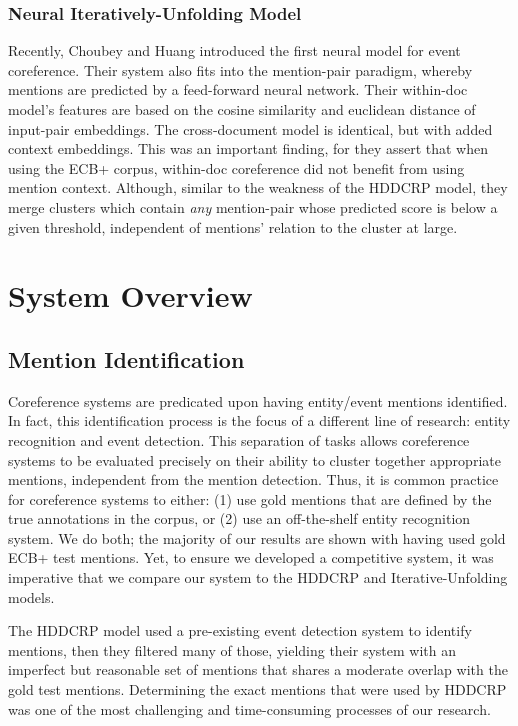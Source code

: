 \documentclass[11pt,a4paper]{article}
\begin{document}
\subsubsection{Neural Iteratively-Unfolding Model}
\label{sec:Choubey}
Recently, Choubey and Huang  introduced the first neural model for event coreference.  Their system also fits into the mention-pair paradigm, whereby mentions are predicted by a feed-forward neural network. Their within-doc model's features are based on the cosine similarity and euclidean distance of input-pair embeddings.  The cross-document model is identical, but with added context embeddings.  This was an important finding, for they assert that when using the ECB+ corpus, within-doc coreference did not benefit from using mention context.  Although, similar to the weakness of the HDDCRP model, they merge clusters which contain \textit{any} mention-pair whose predicted score is below a given threshold, independent of mentions' relation to the cluster at large.

\section{System Overview}
\subsection{Mention Identification}
\label{sec:mentionid}
Coreference systems are predicated upon having entity/event mentions identified.  In fact, this identification process is the focus of a different line of research: entity recognition and event detection.  This separation of tasks allows coreference systems to be evaluated precisely on their ability to cluster together appropriate mentions, independent from the mention detection.  Thus, it is common practice for coreference systems to either: (1) use gold mentions that are defined by the true annotations in the corpus, or (2) use an off-the-shelf entity recognition system.  We do both; the majority of our results are shown with having used gold ECB+ test mentions.  Yet, to ensure we developed a competitive system, it was imperative that we compare our system to the HDDCRP and Iterative-Unfolding models.

The HDDCRP model used a pre-existing event detection system to identify mentions, then they filtered many of those, yielding their system with an imperfect but reasonable set of mentions that shares a moderate overlap with the gold test mentions.  Determining the exact mentions that were used by HDDCRP was one of the most challenging and time-consuming processes of our research.
\end{document}
